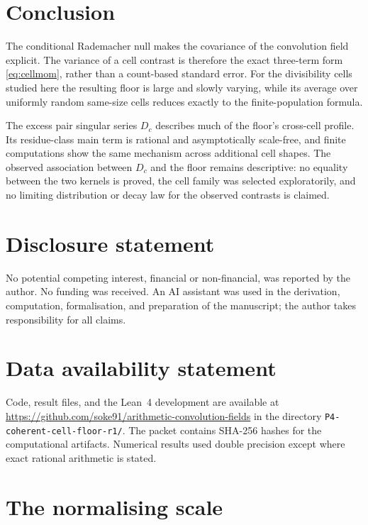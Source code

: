\documentclass[11pt,a4paper]{article}
\theoremstyle{plain}
\theoremstyle{definition}
\theoremstyle{remark}
\begin{document}
\section{Conclusion}

The conditional Rademacher null makes the covariance of the convolution
field explicit.  The variance of a cell contrast is therefore the exact
three-term form \eqref{eq:cellmom}, rather than a count-based standard
error.  For the divisibility cells studied here the resulting floor is
large and slowly varying, while its average over uniformly random
same-size cells reduces exactly to the finite-population formula.

The excess pair singular series $D_c$ describes much of the floor's
cross-cell profile.  Its residue-class main term is rational and
asymptotically scale-free, and finite computations show the same
mechanism across additional cell shapes.  The observed association
between $D_c$ and the floor remains descriptive: no equality between the
two kernels is proved, the cell family was selected exploratorily, and
no limiting distribution or decay law for the observed contrasts is
claimed.

\section*{Disclosure statement}

No potential competing interest, financial or non-financial, was
reported by the author.  No funding was received.  An AI assistant was
used in the derivation, computation, formalisation, and preparation of
the manuscript; the author takes responsibility for all claims.

\section*{Data availability statement}

Code, result files, and the Lean~4 development are available at
\url{https://github.com/soke91/arithmetic-convolution-fields} in the
directory \texttt{P4-coherent-cell-floor-r1/}.  The packet contains
SHA-256 hashes for the computational artifacts.  Numerical results used
double precision except where exact rational arithmetic is stated.

\appendix
\section{The normalising scale}\label{sec:normaliser}
\end{document}
